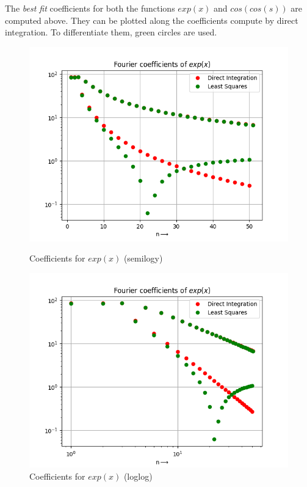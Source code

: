 \documentclass[12pt, a4paper]{article}
\begin{document}
The \textit{best fit} coefficients for both the functions $exp(x)$ and $cos(cos(s))$ are computed above. They can be plotted along the coefficients compute by direct integration. To differentiate them, green circles are used.
\begin{figure}[H]
\centering
\includegraphics[scale=0.75]{Figure_3.png}
\caption{Coefficients for $exp(x)$ (semilogy)}
\centering
\includegraphics[scale=0.75]{Figure_4.png}
\caption{Coefficients for $exp(x)$ (loglog)}
\end{figure}
\end{document}
